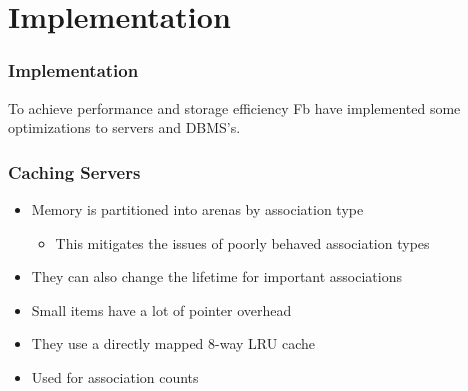 \section{Implementation}
\begin{frame}
\frametitle{Implementation}
To achieve performance and storage efficiency Fb have implemented some optimizations to servers and DBMS's. 
\end{frame}

\begin{frame}[c]\frametitle{Caching Servers}
\begin{itemize}
	\item Memory is partitioned into arenas by association type
	\begin{itemize}
		\item This mitigates the issues of poorly behaved association types
	\end{itemize}
	\item They can also change the lifetime for important associations
	\item Small items have a lot of pointer overhead
	\item They use a directly mapped 8-way LRU cache
	\item Used for association counts

\end{itemize}
    




\end{frame}